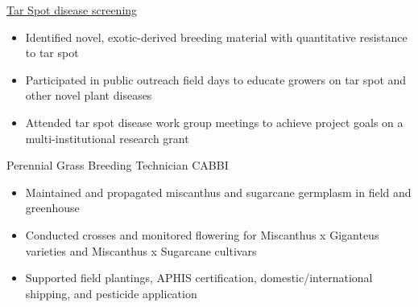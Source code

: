 \noindent
\underline{Tar Spot disease screening}
    \begin{itemize}
        \item Identified novel, exotic-derived breeding material with quantitative resistance to tar spot
        \item Participated in public outreach field days to educate growers on tar spot and other novel plant diseases 
        \item Attended tar spot disease work group meetings to achieve project goals on a multi-institutional research grant
\end{itemize}

    {Perennial Grass Breeding Technician}
    {CABBI}
    {}
\begin{itemize}
    \item Maintained and propagated miscanthus and sugarcane germplasm in field and greenhouse  
    \item Conducted crosses and monitored flowering for Miscanthus x Giganteus varieties and Miscanthus x Sugarcane cultivars
    \item Supported field plantings, APHIS certification, domestic/international shipping, and pesticide application
\end{itemize}
